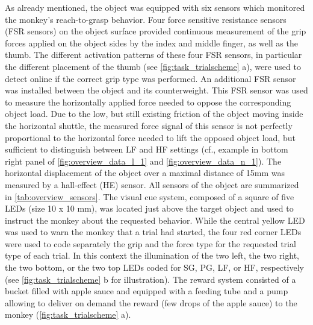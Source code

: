 As already mentioned, the object was equipped with six sensors which monitored the monkey's reach-to-grasp behavior. Four force sensitive resistance sensors (FSR sensors) on the object surface provided continuous measurement of the grip forces applied on the object sides by the index and middle finger, as well as the thumb. The different activation patterns of these four FSR sensors, in particular the different placement of the thumb (see \cref{fig:task_trialscheme} a), were used to detect online if the correct grip type was performed. An additional FSR sensor was installed between the object and its counterweight. This FSR sensor was used to measure the horizontally applied force needed to oppose the corresponding object load. Due to the low, but still existing friction of the object moving inside the horizontal shuttle, the measured force signal of this sensor is not perfectly proportional to the horizontal force needed to lift the opposed object load, but sufficient to distinguish between LF and HF settings (cf., example in bottom right panel of \cref{fig:overview_data_l_1} and \cref{fig:overview_data_n_1}). The horizontal displacement of the object over a maximal distance of 15mm was measured by a hall-effect (HE) sensor. All sensors of the object are summarized in \cref{tab:overview_sensors}. The visual cue system, composed of a square of five LEDs (size 10 x 10 mm), was located just above the target object and used to instruct the monkey about the requested behavior. While the central yellow LED was used to warn the monkey that a trial had started, the four red corner LEDs were used to code separately the grip and the force type for the requested trial type of each trial. In this context the illumination of the two left, the two right, the two bottom, or the two top LEDs coded for SG, PG, LF, or HF, respectively (see \cref{fig:task_trialscheme} b for illustration). The reward system consisted of a bucket filled with apple sauce and equipped with a feeding tube and a pump allowing to deliver on demand the reward (few drops of the apple sauce) to the monkey (\cref{fig:task_trialscheme} a).

